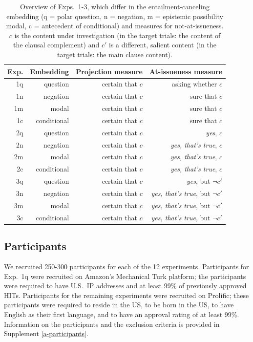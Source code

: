 \documentclass[11pt,fleqn]{article}
\newcommand{\6}{\mbox{$[\hspace*{-.6mm}[$}}
\newcommand{\9}{\mbox{$]\hspace*{-.6mm}]$}}
\begin{document}
\begin{table}[h!]
\centering
\begin{tabular}{r | r | r | r}

{\bf Exp.} & {\bf Embedding} & {\bf Projection measure} & {\bf At-issueness measure} \\ 
\hline
1q & question & certain that $c$ & asking whether $c$ \\
1n & negation & certain that $c$ & sure that $c$ \\
1m & modal & certain that $c$ & sure that $c$ \\
1c & conditional & certain that $c$ & sure that $c$ \\
\hline
2q & question & certain that $c$ & {\em yes}, $c$ \\ 
2n & negation & certain that $c$& {\em yes, that's true}, $c$ \\ 
2m & modal & certain that $c$& {\em yes, that's true}, $c$ \\ 
2c & conditional & certain that $c$& {\em yes, that's true}, $c$ \\ 
\hline
3q & question & certain that $c$& {\em yes}, but $\neg c'$ \\ 
3n & negation & certain that $c$& {\em yes, that's true}, but $\neg c'$ \\ 
3m & modal & certain that $c$& {\em yes, that's true}, but $\neg c'$ \\ 
3c & conditional & certain that $c$& {\em yes, that's true}, but $\neg c'$ \\ 
\hline
\end{tabular}
\caption{Overview of Exps.~1-3, which differ in the entailment-canceling embedding (q = polar question, n = negation, m = epistemic possibility modal, c = antecedent of conditional) and measures for not-at-issueness. $c$ is the content under investigation (in the target trials: the content of the clausal complement) and $c'$ is a different, salient content (in the target trials: the main clause content).}\label{t:overview}
\end{table}

\subsection{Participants}

We recruited 250-300 participants for each of the 12 experiments. Participants for Exp.~1q were recruited on Amazon's Mechanical Turk platform; the participants were required to have U.S.\ IP addresses and at least 99\% of previously approved HITs. Participants for the remaining experiments were recruited on Prolific; these participants were required to reside in the US, to be born in the US, to have English as their first language, and to have an approval rating of at least 99\%. Information on the participants and the exclusion criteria is provided in Supplement \ref{a-participants}.
\end{document}
